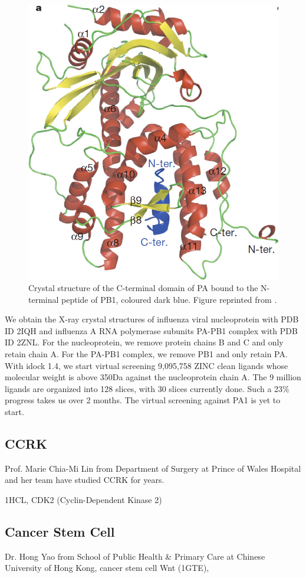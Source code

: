 \begin{figure}
\centering
\includegraphics[width=\linewidth]{Case/InfluenzaPAPB1.png}
\caption{Crystal structure of the C-terminal domain of PA bound to the N-terminal peptide of PB1, coloured dark blue. Figure reprinted from \citep{1141}.}
\label{Case:InfluenzaPAPB1}
\end{figure}

We obtain the X-ray crystal structures of influenza viral nucleoprotein with PDB ID 2IQH and influenza A RNA polymerase subunits PA-PB1 complex with PDB ID 2ZNL. For the nucleoprotein, we remove protein chains B and C and only retain chain A. For the PA-PB1 complex, we remove PB1 and only retain PA. With idock 1.4, we start virtual screening 9,095,758 ZINC \citep{532} clean ligands whose molecular weight is above 350Da against the nucleoprotein chain A. The 9 million ligands are organized into 128 slices, with 30 slices currently done. Such a 23\% progress takes us over 2 months. The virtual screening against PA1 is yet to start.


\subsection{CCRK}

Prof. Marie Chia-Mi Lin from Department of Surgery at Prince of Wales Hospital and her team have studied CCRK for years.

1HCL, CDK2 (Cyclin-Dependent Kinase 2) \citep{1142}

\subsection{Cancer Stem Cell}

Dr. Hong Yao from School of Public Health \& Primary Care at Chinese University of Hong Kong, cancer stem cell Wnt (1GTE), 

\chapterend